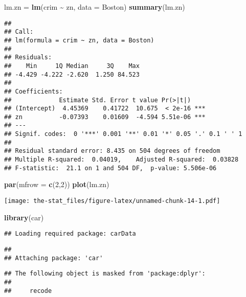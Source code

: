 \documentclass[
]{article}
\newenvironment{Shaded}{\begin{snugshade}}{\end{snugshade}}
\newcommand{\AttributeTok}[1]{\textcolor[rgb]{0.13,0.29,0.53}{#1}}
\newcommand{\DecValTok}[1]{\textcolor[rgb]{0.00,0.00,0.81}{#1}}
\newcommand{\FunctionTok}[1]{\textcolor[rgb]{0.13,0.29,0.53}{\textbf{#1}}}
\newcommand{\NormalTok}[1]{#1}
\newcommand{\OtherTok}[1]{\textcolor[rgb]{0.56,0.35,0.01}{#1}}
\newcommand{\SpecialCharTok}[1]{\textcolor[rgb]{0.81,0.36,0.00}{\textbf{#1}}}
\begin{document}
\begin{Shaded}
\begin{Highlighting}[]
\NormalTok{lm.zn }\OtherTok{=} \FunctionTok{lm}\NormalTok{(crim }\SpecialCharTok{\textasciitilde{}}\NormalTok{ zn, }\AttributeTok{data =}\NormalTok{ Boston)}
\FunctionTok{summary}\NormalTok{(lm.zn)}
\end{Highlighting}
\end{Shaded}

\begin{verbatim}
## 
## Call:
## lm(formula = crim ~ zn, data = Boston)
## 
## Residuals:
##    Min     1Q Median     3Q    Max 
## -4.429 -4.222 -2.620  1.250 84.523 
## 
## Coefficients:
##             Estimate Std. Error t value Pr(>|t|)    
## (Intercept)  4.45369    0.41722  10.675  < 2e-16 ***
## zn          -0.07393    0.01609  -4.594 5.51e-06 ***
## ---
## Signif. codes:  0 '***' 0.001 '**' 0.01 '*' 0.05 '.' 0.1 ' ' 1
## 
## Residual standard error: 8.435 on 504 degrees of freedom
## Multiple R-squared:  0.04019,    Adjusted R-squared:  0.03828 
## F-statistic:  21.1 on 1 and 504 DF,  p-value: 5.506e-06
\end{verbatim}

\begin{Shaded}
\begin{Highlighting}[]
\FunctionTok{par}\NormalTok{(}\AttributeTok{mfrow =} \FunctionTok{c}\NormalTok{(}\DecValTok{2}\NormalTok{,}\DecValTok{2}\NormalTok{))}
\FunctionTok{plot}\NormalTok{(lm.zn)}
\end{Highlighting}
\end{Shaded}

\texttt{[image: the-stat\_files/figure-latex/unnamed-chunk-14-1.pdf]}

\begin{Shaded}
\begin{Highlighting}[]
\FunctionTok{library}\NormalTok{(car)}
\end{Highlighting}
\end{Shaded}

\begin{verbatim}
## Loading required package: carData
\end{verbatim}

\begin{verbatim}
## 
## Attaching package: 'car'
\end{verbatim}

\begin{verbatim}
## The following object is masked from 'package:dplyr':
## 
##     recode
\end{verbatim}
\end{document}
